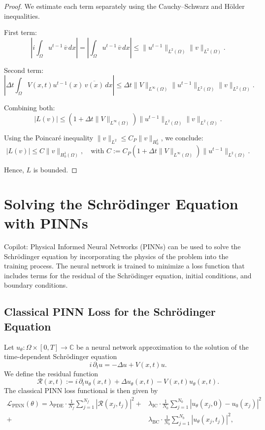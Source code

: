 \documentclass{article}
\theoremstyle{definition}
\theoremstyle{plain}
\theoremstyle{remark}
\begin{document}
\begin{proof}
We estimate each term separately using the Cauchy–Schwarz and Hölder inequalities.

First term:
\[
\left| i \int_\Omega u^{t-1} \, \overline{v} \, dx \right| = \left| \int_\Omega u^{t-1} \, \overline{v} \, dx \right| \leq \|u^{t-1}\|_{L^2(\Omega)} \|v\|_{L^2(\Omega)}.
\]

Second term:
\[
\left| \Delta t \int_\Omega V(x,t) u^{t-1}(x) \, \overline{v(x)} \, dx \right| \leq \Delta t \|V\|_{L^\infty(\Omega)} \|u^{t-1}\|_{L^2(\Omega)} \|v\|_{L^2(\Omega)}.
\]

Combining both:
\[
|L(v)| \leq \left(1 + \Delta t \|V\|_{L^\infty(\Omega)}\right) \|u^{t-1}\|_{L^2(\Omega)} \|v\|_{L^2(\Omega)}.
\]

Using the Poincaré inequality \( \|v\|_{L^2} \leq C_P \|v\|_{H_0^1} \), we conclude:
\[
|L(v)| \leq C \|v\|_{H_0^1(\Omega)}, \quad \text{with } C := C_P \left(1 + \Delta t \|V\|_{L^\infty(\Omega)}\right) \|u^{t-1}\|_{L^2(\Omega)}.
\]

Hence, \( L \) is bounded.
\end{proof}


\section{Solving the Schrödinger Equation with PINNs}
Copilot:
Physical Informed Neural Networks (PINNs) can be used to solve the Schrödinger equation by incorporating the physics of the problem into the training process. The neural network is trained to minimize a loss function that includes terms for the residual of the Schrödinger equation, initial conditions, and boundary conditions.
\subsection*{Classical PINN Loss for the Schrödinger Equation}

Let $u_\theta : \Omega \times [0,T] \to \mathbb{C}$ be a neural network approximation to the solution of the time-dependent Schrödinger equation
\[
i \, \partial_t u = -\Delta u + V(x,t) u.
\]
We define the residual function
\[
\mathcal{R}(x,t) := i \, \partial_t u_\theta(x,t) + \Delta u_\theta(x,t) - V(x,t) u_\theta(x,t).
\]
The classical PINN loss functional is then given by
\begin{align*}
\mathcal{L}_{\mathrm{PINN}}(\theta) =
\lambda_{\mathrm{PDE}} \cdot \frac{1}{N_f} \sum_{j=1}^{N_f} \left| \mathcal{R}(x_j, t_j) \right|^2
+& \lambda_{\mathrm{IC}} \cdot \frac{1}{N_0} \sum_{j=1}^{N_0} \left| u_\theta(x_j, 0) - u_0(x_j) \right|^2\\
+& \lambda_{\mathrm{BC}} \cdot \frac{1}{N_b} \sum_{j=1}^{N_b} \left| u_\theta(x_j, t_j) \right|^2,    
\end{align*}
\end{document}
